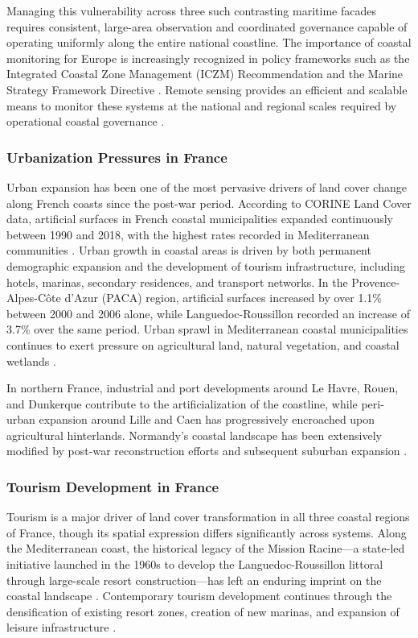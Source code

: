 \documentclass[coasts,article,accept,pdftex,moreauthors]{Definitions/mdpi}
\begin{document}
{Managing this vulnerability across three such contrasting maritime facades requires consistent, large-area observation and coordinated governance capable of operating uniformly along the entire national coastline.} The importance of coastal monitoring for Europe is increasingly recognized in policy frameworks such as the Integrated Coastal Zone Management (ICZM) Recommendation and the Marine Strategy Framework Directive \citep{EEA2019}. Remote sensing provides an efficient and scalable means to monitor these systems at the national and regional scales required by operational coastal governance \citep{Graffin2024,Liu2023}.

\subsubsection{Urbanization Pressures in France}

Urban expansion has been one of the most pervasive drivers of land cover change along French coasts since the post-war period. According to CORINE Land Cover data, artificial surfaces in French coastal municipalities expanded continuously between 1990 and 2018, with the highest rates recorded in Mediterranean communities \citep{EEA_CLC2018,Perrin2016}. Urban growth in coastal areas is driven by both permanent demographic expansion and the development of tourism infrastructure, including hotels, marinas, secondary residences, and transport networks. In the Provence-Alpes-C\^ote d'Azur (PACA) region, artificial surfaces increased by over 1.1\% between 2000 and 2006 alone, while Languedoc-Roussillon recorded an increase of 3.7\% over the same period. Urban sprawl in Mediterranean coastal municipalities continues to exert pressure on agricultural land, natural vegetation, and coastal wetlands \citep{Salvati2014}.

In northern France, industrial and port developments around Le Havre, Rouen, and Dunkerque contribute to the artificialization of the coastline, while peri-urban expansion around Lille and Caen has progressively encroached upon agricultural hinterlands. Normandy's coastal landscape has been extensively modified by post-war reconstruction efforts and subsequent suburban expansion \citep{Burak2004}.

\subsubsection{Tourism Development in France}

Tourism is a major driver of land cover transformation in all three coastal regions of France, though its spatial expression differs significantly across systems. Along the Mediterranean coast, the historical legacy of the Mission Racine—a state-led initiative launched in the 1960s to develop the Languedoc-Roussillon littoral through large-scale resort construction—has left an enduring imprint on the coastal landscape \citep{Vlassi2019a,Vlassi2019b}. Contemporary tourism development continues through the densification of existing resort zones, creation of new marinas, and expansion of leisure infrastructure \citep{hatt2020amenagement,bernard2016nautisme}.
\end{document}
